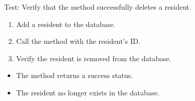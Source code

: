 \documentclass[letterpaper,10pt,english]{sphinxmanual}
\begin{document}
\begin{fulllineitems}
\label{\detokenize{test:test.test_residetnt.test_delete_resident_success}}
\pysigstartsignatures
\pysiglinewithargsret
{}
{}
{}
\pysigstopsignatures
\sphinxAtStartPar
Test: Verify that the method successfully deletes a resident.
\begin{description}
\begin{enumerate}
%
\item {} 
\sphinxAtStartPar
Add a resident to the database.

\item {} 
\sphinxAtStartPar
Call the  method with the resident’s ID.

\item {} 
\sphinxAtStartPar
Verify the resident is removed from the database.

\end{enumerate}

\begin{itemize}
\item {} 
\sphinxAtStartPar
The method returns a success status.

\item {} 
\sphinxAtStartPar
The resident no longer exists in the database.

\end{itemize}

\end{description}

\end{fulllineitems}

\end{document}
